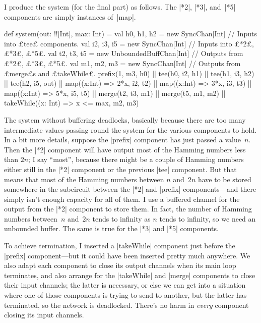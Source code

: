 
\begin{answerI}
I produce the system (for the final part) as follows.  The |*2|, |*3|,
and~|*5| components are simply instances of~|map|.
%
\begin{scala}
def system(out: !![Int], max: Int) = {
  val h0, h1, h2 = new SyncChan[Int]     // Inputs into £tee£ components.
  val i2, i3, i5 = new SyncChan[Int]     // Inputs into £*2£, £*3£, £*5£.
  val t2, t3, t5 = new UnboundedBuffChan[Int] // Outputs from £*2£, £*3£, £*5£.
  val m1, m2, m3 = new SyncChan[Int]    // Outputs from £merge£s and £takeWhile£.
  prefix(1, m3, h0) || tee(h0, i2, h1) || tee(h1, i3, h2) || tee(h2, i5, out) ||
  map((x:Int) => 2*x, i2, t2) || map((x:Int) => 3*x, i3, t3) || 
  map((x:Int) => 5*x, i5, t5) ||  
  merge(t2, t3, m1) || merge(t5, m1, m2) || 
  takeWhile((x: Int) => x <= max, m2, m3)
}
\end{scala}

The system without buffering deadlocks, basically because there are too many
intermediate values passing round the system for the various components to
hold.  In a bit more details, suppose the |prefix| component has just passed
a value~$n$.  Then the |*2| component will have output most of the Hamming
numbers less than $2n$; I say ``most'', because there might be a couple of
Hamming numbers either still in the |*2| component or the previous |tee|
component.  But that means that most of the Hamming numbers between $n$
and~$2n$ have to be stored somewhere in the subcircuit between the |*2| and
|prefix| components---and there simply isn't enough capacity for all of them.  
I use a buffered channel for the output from the |*2| component to store
them.  In fact, the number of Hamming numbers between~$n$ and~$2n$ tends to
infinity as $n$ tends to infinity, so we need an unbounded buffer.  The same
is true for the |*3| and |*5| components. 

To achieve termination, I inserted a |takeWhile| component just before the
|prefix| component---but it could have been inserted pretty much anywhere.  We
also adapt each component to close its output channels when its main loop
terminates, and also arrange for the |takeWhile| and |merge| components to
close their input channels; the latter is necessary, or else we can get into a
situation where one of those components is trying to send to another, but the
latter has terminated, so the network is deadlocked.  There's no harm in
\emph{every} component closing its input channels. 
\end{answerI}
